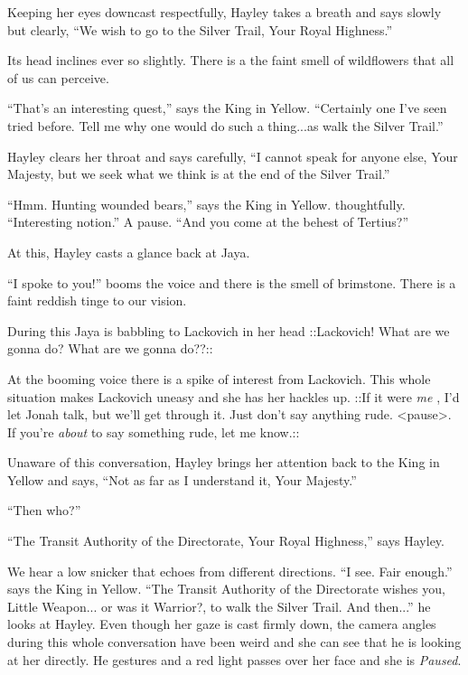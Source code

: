 Keeping her eyes downcast respectfully, Hayley takes a breath and says slowly but clearly, ``We wish to go to the Silver Trail, Your Royal Highness.'' 

Its head inclines ever so slightly.  There is a the faint smell of wildflowers that all of us can perceive.

``That's an interesting quest,'' says the King in Yellow.  ``Certainly one I've seen tried before.  Tell me why one would do such a thing...as walk the Silver Trail.''



Hayley clears her throat and says carefully, ``I cannot speak for anyone else, Your Majesty, but we seek what we think is at the end of the Silver Trail.''

``Hmm.  Hunting wounded bears,'' says the King in Yellow. thoughtfully. ``Interesting notion.''  A pause. ``And you come at the behest of Tertius?''



At this, Hayley casts a glance back at Jaya.

``I spoke to you!'' booms the voice and there is the smell of brimstone.  There is a faint reddish tinge to our vision.

During this Jaya is babbling to Lackovich in her head  {\color[RGB]{255,0,0}::Lackovich!  What are we gonna do?  What are we gonna do??::  } 

At the booming voice there is a spike of interest from Lackovich.  This whole situation makes Lackovich uneasy and she has her hackles up.   {\color[RGB]{74,134,232}::If it were } \textit{ {\color[RGB]{74,134,232}me} } {\color[RGB]{74,134,232}, I'd let Jonah talk, but we'll get through it.  Just don't say anything rude.  \textless pause\textgreater .  If you're } \textit{ {\color[RGB]{74,134,232}about} } {\color[RGB]{74,134,232} to say something rude, let me know.::} 

Unaware of this conversation, Hayley brings her attention back to the King in Yellow and says, ``Not as far as I understand it, Your Majesty.''

``Then who?''

``The Transit Authority of the Directorate, Your Royal Highness,'' says Hayley.

We hear a low snicker that echoes from different directions.  ``I see.  Fair enough.'' says the King in Yellow.  ``The Transit Authority of the Directorate wishes you, Little Weapon... or was it Warrior?, to walk the Silver Trail.  And then...'' he looks at Hayley.  Even though her gaze is cast firmly down, the camera angles during this whole conversation have been weird and she can see that he is looking at her directly.  He gestures and a red light passes over her face and she is \textit{Paused}.  



